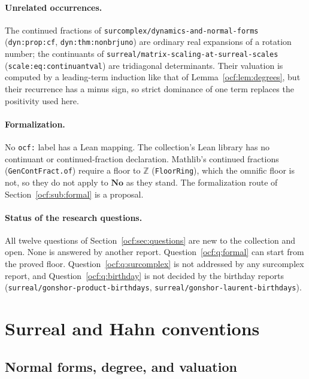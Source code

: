 \documentclass[11pt,a4paper]{article}
\numberwithin{equation}{section}
\theoremstyle{definition}
\theoremstyle{remark}
\newcommand{\No}{\mathbf{No}}
\newcommand{\Z}{\mathbb Z}
\newcommand{\rpath}[1]{\nolinkurl{#1}}%
\newcommand{\lbl}[1]{\nolinkurl{#1}}%
\begin{document}
\paragraph{Unrelated occurrences.} The continued fractions of
\rpath{surcomplex/dynamics-and-normal-forms} (\lbl{dyn:prop:cf},
\lbl{dyn:thm:nonbrjuno}) are ordinary real expansions of a rotation
number; the continuants of \rpath{surreal/matrix-scaling-at-surreal-scales}
(\lbl{scale:eq:continuantval}) are tridiagonal determinants. Their
valuation is computed by a leading-term induction like that of
Lemma~\ref{ocf:lem:degrees}, but their recurrence has a minus sign, so
strict dominance of one term replaces the positivity used here.

\paragraph{Formalization.} No \texttt{ocf:} label has a Lean mapping. The
collection's Lean library has no continuant or continued-fraction
declaration. Mathlib's continued fractions (\texttt{GenContFract.of})
require a floor to $\Z$ (\texttt{FloorRing}), which the omnific floor is
not, so they do not apply to $\No$ as they stand. The formalization route of
Section~\ref{ocf:sub:formal} is a proposal.

\paragraph{Status of the research questions.} All twelve questions of
Section~\ref{ocf:sec:questions} are new to the collection and open. None
is answered by another report. Question~\ref{ocf:q:formal} can start from
the proved floor. Question~\ref{ocf:q:surcomplex} is not addressed by
any surcomplex report, and Question~\ref{ocf:q:birthday} is not decided by
the birthday reports (\rpath{surreal/gonshor-product-birthdays},
\rpath{surreal/gonshor-laurent-birthdays}).

\section{Surreal and Hahn conventions}
\label{ocf:sec:prelim}

\subsection{Normal forms, degree, and valuation}
\end{document}
